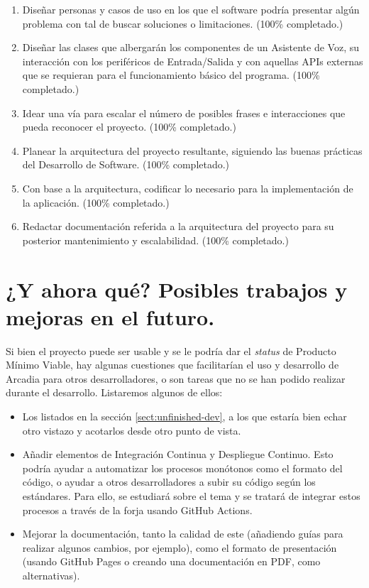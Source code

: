 \begin{enumerate}[O-DD.1 -]
	\item Diseñar personas y casos de uso en los que el software podría presentar algún problema con tal de buscar soluciones o limitaciones. (100\% completado.)
	\item Diseñar las clases que albergarán los componentes de un Asistente de Voz, su interacción con los periféricos de Entrada/Salida y con aquellas APIs externas que se requieran para el funcionamiento básico del programa. (100\% completado.)
	\item Idear una vía para escalar el número de posibles frases e interacciones que pueda reconocer el proyecto. (100\% completado.)
	\item Planear la arquitectura del proyecto resultante, siguiendo las buenas prácticas del Desarrollo de Software. (100\% completado.)
	\item Con base a la arquitectura, codificar lo necesario para la implementación de la aplicación. (100\% completado.)
	\item Redactar documentación referida a la arquitectura del proyecto para su posterior mantenimiento y escalabilidad. (100\% completado.)
	
\end{enumerate}


\section{¿Y ahora qué? Posibles trabajos y mejoras en el futuro.}
Si bien el proyecto puede ser usable y se le podría dar el \textit{status} de Producto Mínimo Viable, hay algunas cuestiones que facilitarían el uso y desarrollo de Arcadia para otros desarrolladores, o son tareas que no se han podido realizar durante el desarrollo. Listaremos algunos de ellos:

\begin{itemize}
	\item Los listados en la sección \ref{sect:unfinished-dev}, a los que estaría bien echar otro vistazo y acotarlos desde otro punto de vista.
	\item Añadir elementos de Integración Continua y Despliegue Continuo. Esto podría ayudar a automatizar los procesos monótonos como el formato del código, o ayudar a otros desarrolladores a subir su código según los estándares. Para ello, se estudiará sobre el tema y se tratará de integrar estos procesos a través de la forja usando GitHub Actions.
	\item Mejorar la documentación, tanto la calidad de este (añadiendo guías para realizar algunos cambios, por ejemplo), como el formato de presentación (usando GitHub Pages  o creando una documentación en PDF, como alternativas).
\end{itemize}

